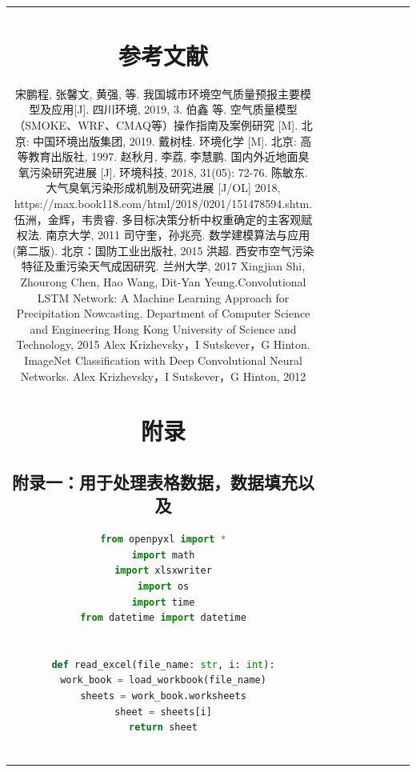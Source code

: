 \documentclass[bwprint]{gmcmthesis}
\numberwithin{figure}{section}
\begin{document}
\begin{table}
\begin{center}
{\begin{tabular}[ht]{|c|c|c|c|c|c|c|c|c|}
%

\section{参考文献}
\begin{thebibliography}{1.2}%
\setlength{\itemsep}{-2mm}
 \bibitem{ref1}
 宋鹏程, 张馨文, 黄强, 等. 我国城市环境空气质量预报主要模型及应用[J]. 四川环境, 2019, 3.
 \bibitem{ref2}
 伯鑫 等. 空气质量模型（SMOKE、WRF、CMAQ等）操作指南及案例研究 [M]. 北京: 中国环境出版集团, 2019.
 \bibitem{ref3}
 戴树桂. 环境化学 [M]. 北京: 高等教育出版社, 1997.
 \bibitem{ref4}
 赵秋月, 李荔, 李慧鹏. 国内外近地面臭氧污染研究进展 [J]. 环境科技, 2018, 31(05): 72-76.
 \bibitem{ref5}
 陈敏东. 大气臭氧污染形成机制及研究进展 [J/OL] 2018, https://max.book118.com/html/2018/0201/151478594.shtm. 
 \bibitem{ref6}
 伍洲，金辉，韦贵睿. 多目标决策分析中权重确定的主客观赋权法. 南京大学, 2011
 \bibitem{ref7}
 司守奎，孙兆亮. 数学建模算法与应用(第二版). 北京：国防工业出版社, 2015
 \bibitem{ref8}
 洪超. 西安市空气污染特征及重污染天气成因研究. 兰州大学, 2017
 \bibitem{ref9}
 Xingjian Shi, Zhourong Chen, Hao Wang, Dit-Yan Yeung.Convolutional LSTM Network: A Machine Learning Approach for Precipitation Nowcasting.
 Department of Computer Science and Engineering Hong Kong University of Science and Technology, 2015
 \bibitem{ref10}
 Alex Krizhevsky，I Sutskever，G Hinton. ImageNet Classification with Deep Convolutional Neural Networks. Alex Krizhevsky，I Sutskever，G Hinton, 2012
 
\end{thebibliography}

\newpage
\appendix
\section{附录}
\subsection{附录一：用于处理表格数据，数据填充以及}
\begin{lstlisting}[language=Python] 
from openpyxl import *
import math
import xlsxwriter
import os
import time
from datetime import datetime


def read_excel(file_name: str, i: int):
work_book = load_workbook(file_name)
sheets = work_book.worksheets
sheet = sheets[i]
return sheet



\end{lstlisting}
\end{tabular}}
\end{center}
\end{table}
\end{document}

